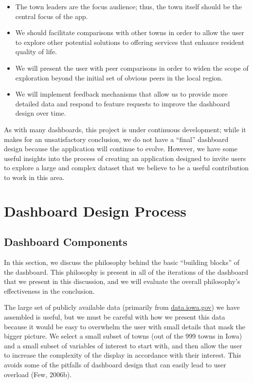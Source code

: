 \documentclass[print]{nuthesis}
\begin{document}
\begin{itemize}
\item The town leaders are the focus audience; thus, the town itself should be the central focus of the app.
\item We should facilitate comparisons with other towns in order to allow the user to explore other potential solutions to offering services that enhance resident quality of life.
\item We will present the user with peer comparisons in order to widen the scope of exploration beyond the initial set of obvious peers in the local region.
\item We will implement feedback mechanisms that allow us to provide more detailed data and respond to feature requests to improve the dashboard design over time.
\end{itemize}

As with many dashboards, this project is under continuous development; while it makes for an unsatisfactory conclusion, we do not have a ``final'' dashboard design because the application will continue to evolve. However, we have some useful insights into the process of creating an application designed to invite users to explore a large and complex dataset that we believe to be a useful contribution to work in this area.

\hypertarget{dashboard-design-process}{%
\section{Dashboard Design Process}\label{dashboard-design-process}}

\hypertarget{dashboard-components}{%
\subsection{Dashboard Components}\label{dashboard-components}}

In this section, we discuss the philosophy behind the basic ``building blocks'' of the dashboard. This philosophy is present in all of the iterations of the dashboard that we present in this discussion, and we will evaluate the overall philosophy's effectiveness in the conclusion.

The large set of publicly available data (primarily from \url{data.iowa.gov}) we have assembled is useful, but we must be careful with how we present this data because it would be easy to overwhelm the user with small details that mask the bigger picture. We select a small subset of towns (out of the 999 towns in Iowa) and a small subset of variables of interest to start with, and then allow the user to increase the complexity of the display in accordance with their interest. This avoids some of the pitfalls of dashboard design that can easily lead to user overload (Few, 2006b).
\end{document}
